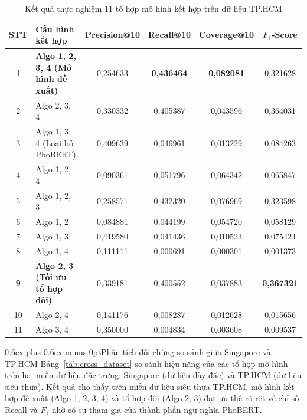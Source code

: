 \documentclass[journal,onecolumn,10pt]{IEEEtran}
\makeatletter
\def\subsection{\@startsection{subsection}{2}{\z@}{1.8ex plus 1.0ex minus 0.3ex}%
{0.6ex plus 0.6ex minus 0pt}{\normalfont\normalsize\bfseries}}
\makeatother
\begin{document}
\begin{table}[H]
\centering
\caption{Kết quả thực nghiệm 11 tổ hợp mô hình kết hợp trên dữ liệu TP.HCM}
\label{tab:ensemble}
\small
\setlength{\tabcolsep}{8pt}
\begin{tabular}{clcccc}
\toprule
\textbf{STT} & \textbf{Cấu hình kết hợp} & \textbf{Precision@10} & \textbf{Recall@10} & \textbf{Coverage@10} & \textbf{$F_1$-Score} \\
\midrule
\textbf{1} & \textbf{Algo 1, 2, 3, 4 (Mô hình đề xuất)} & 0,254633 & \textbf{0,436464} & \textbf{0,082081} & 0,321628 \\
2 & Algo 2, 3, 4 & 0,330332 & 0,405387 & 0,043596 & 0,364031 \\
3 & Algo 1, 3, 4 (Loại bỏ PhoBERT) & 0,409639 & 0,046961 & 0,013229 & 0,084263 \\
4 & Algo 1, 2, 4 & 0,090361 & 0,051796 & 0,064342 & 0,065847 \\
5 & Algo 1, 2, 3 & 0,258571 & 0,432320 & 0,076969 & 0,323598 \\
6 & Algo 1, 2 & 0,084881 & 0,044199 & 0,054720 & 0,058129 \\
7 & Algo 1, 3 & 0,419580 & 0,041436 & 0,010523 & 0,075424 \\
8 & Algo 1, 4 & 0,111111 & 0,000691 & 0,000301 & 0,001373 \\
\textbf{9} & \textbf{Algo 2, 3 (Tối ưu tổ hợp đôi)} & 0,339181 & 0,400552 & 0,037883 & \textbf{0,367321} \\
10 & Algo 2, 4 & 0,141176 & 0,008287 & 0,012628 & 0,015656 \\
11 & Algo 3, 4 & 0,350000 & 0,004834 & 0,003608 & 0,009537 \\
\bottomrule
\end{tabular}
\end{table}

\subsection{Phân tích đối chứng so sánh giữa Singapore và TP.HCM}
Bảng~\ref{tab:cross_dataset} so sánh hiệu năng của các tổ hợp mô hình trên hai miền dữ liệu đặc trưng: Singapore (dữ liệu dày đặc) và TP.HCM (dữ liệu siêu thưa). Kết quả cho thấy trên miền dữ liệu siêu thưa TP.HCM, mô hình kết hợp đề xuất (Algo 1, 2, 3, 4) và tổ hợp đôi (Algo 2, 3) đạt ưu thế rõ rệt về chỉ số Recall và $F_1$ nhờ có sự tham gia của thành phần ngữ nghĩa PhoBERT.
\end{document}
